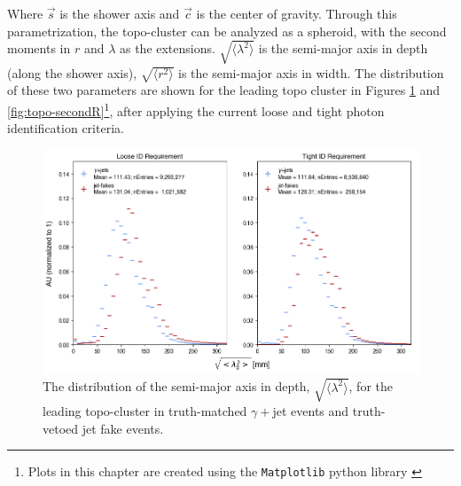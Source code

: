 Where $\vec{s}$ is the shower axis and $\vec{c}$ is the center of gravity. Through this parametrization, the topo-cluster can be analyzed as a spheroid, with the second moments in $r$ and $\lambda$ as the extensions. $\sqrt{\langle \lambda^2 \rangle}$ is the semi-major axis in depth (along the shower axis), $\sqrt{\langle r^2 \rangle}$ is the semi-major axis in width. The distribution of these two parameters are shown for the leading topo cluster in Figures \ref{fig:topo-secondLambda} and \ref{fig:topo-secondR}\footnote{Plots in this chapter are created using the \texttt{Matplotlib} python library \cite{matplotlib}}, after applying the current loose and tight photon identification criteria.

\begin{figure}
    \centering
    \includegraphics[width=\textwidth]{chapters/chapter4_photonID/images/hists/y_topoCluster0_secondLambda.png}
    \caption[The distribution of the semi-major axis in depth, $\sqrt{\langle \lambda^2 \rangle}$, for the leading topo-cluster]{The distribution of the semi-major axis in depth, $\sqrt{\langle \lambda^2 \rangle}$, for the leading topo-cluster in truth-matched $\gamma+$jet events and truth-vetoed jet fake events.}
    \label{fig:topo-secondLambda}

\end{figure}

